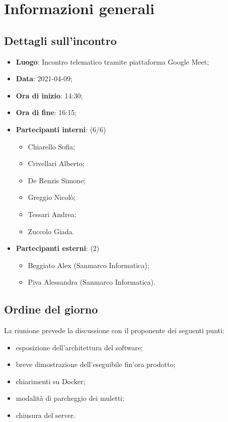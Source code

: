 \section{Informazioni generali}

\subsection{Dettagli sull'incontro}
\begin{itemize}
\item \textbf{Luogo}: Incontro telematico tramite piattaforma Google Meet;
\item \textbf{Data}: 2021-04-09;
\item \textbf{Ora di inizio}: 14:30;
\item \textbf{Ora di fine}: 16:15;
\item \textbf{Partecipanti interni}: (6/6)
\begin{itemize}
	\item Chiarello Sofia;
	\item Crivellari Alberto;
	\item De Renzis Simone;
	\item Greggio Nicolò;
	\item Tessari Andrea;
	\item Zuccolo Giada.
\end{itemize}
\item \textbf{Partecipanti esterni}: (2)
\begin{itemize}
	\item Beggiato Alex (Sanmarco Informatica);
	\item Piva Alessandra (Sanmarco Informatica).
\end{itemize}
\end{itemize}

\subsection{Ordine del giorno}

La riunione prevede la discussione con il proponente dei seguenti punti:
\begin{itemize}
	\item esposizione dell'architettura del software;
	\item breve dimostrazione dell'eseguibile fin'ora prodotto;
	\item chiarimenti su Docker;
	\item modalità di parcheggio dei muletti;
	\item chiusura del server.
\end{itemize}




